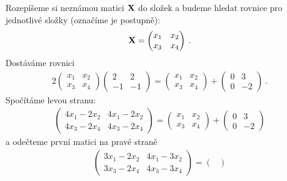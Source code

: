 \begin{example}
    Rozepíšeme si neznámou matici $\mathbf{X}$ do složek a budeme hledat rovnice pro jednotlivé složky (označíme je postupně):
    \begin{align}
        \mathbf{X} = \begin{pmatrix}
            x_1 & x_2 \\ x_3 & x_4
        \end{pmatrix} \:.
    \end{align}
    Dostáváme rovnici
    \begin{align}
        2
        \begin{pmatrix}
            x_1 & x_2 \\ x_3 & x_4
        \end{pmatrix}
        \begin{pmatrix}
            2 & 2 \\ -1 & -1
        \end{pmatrix}
        =
        \begin{pmatrix}
            x_1 & x_2 \\ x_3 & x_4
        \end{pmatrix}
        +
        \begin{pmatrix}
            0 & 3 \\ 0 & -2
        \end{pmatrix}
        \:.
    \end{align}
    Spočítáme levou stranu:
    \begin{align}
        \begin{pmatrix}
            4 x_1 - 2 x_2 & 4 x_1 - 2 x_2 \\ 4 x_3 - 2 x_4 & 4 x_3 - 2 x_4
        \end{pmatrix} 
        =
        \begin{pmatrix}
            x_1 & x_2 \\ x_3 & x_4
        \end{pmatrix}
        +
        \begin{pmatrix}
            0 & 3 \\ 0 & -2
        \end{pmatrix}
    \end{align}
    a odečteme první matici na pravé straně
    \begin{align}
        \begin{pmatrix}
            3 x_1 - 2 x_2 & 4 x_1 - 3 x_2 \\ 3 x_3 - 2 x_4 & 4 x_3 - 3 x_4
        \end{pmatrix}
        =
        \begin{pmatrix}

\end{pmatrix}
\end{align}
\end{example}
